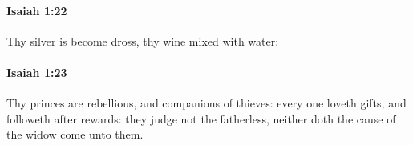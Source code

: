 		\paragraph{Isaiah 1:22} %
			\label{ISAIAH-1-22}

			Thy silver is become dross, thy wine mixed with water:


		\paragraph{Isaiah 1:23} %
			\label{ISAIAH-1-23}

			Thy princes are rebellious, and companions of thieves: every one loveth gifts, and followeth after rewards: they judge not the fatherless, neither doth the cause of the widow come unto them.


